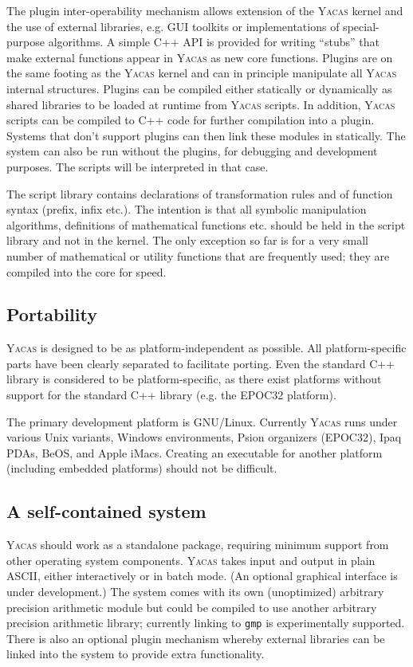 \documentclass{llncs}
\begin{document}
The plugin inter-operability mechanism allows extension of the \textsc{Yacas} kernel and the use of external libraries, e.g. GUI toolkits or implementations of special-purpose algorithms. A simple C++ API is provided for writing ``stubs'' that make external functions appear in \textsc{Yacas} as new core functions. Plugins are on the same footing as the \textsc{Yacas} kernel and can in principle manipulate all \textsc{Yacas} internal structures. Plugins can be compiled either statically or dynamically as shared libraries to be loaded at runtime from \textsc{Yacas} scripts. 
In addition, \textsc{Yacas} scripts can be compiled to C++ code for further
compilation into a plugin. Systems that don't support plugins can then
link these modules in statically. The system can also be run without
the plugins, for debugging and development purposes. The scripts
will be interpreted in that case.

The script library contains declarations of transformation rules and of function
syntax (prefix, infix etc.). The intention is that all symbolic manipulation algorithms, definitions
of mathematical functions etc. should be held in the script library and not in the kernel. The
only exception so far is for a very small number of mathematical or utility
functions that are frequently used; they are compiled into the core for speed.

\subsection*{%
Portability}
\textsc{Yacas} is designed to be as platform-independent as possible.
All platform-specific parts have been clearly separated to facilitate porting.
Even the standard C++ library is considered to be platform-specific, as there
exist  platforms without support for the standard C++ library (e.g. the
EPOC32 platform).

The primary development platform is GNU/Linux. Currently \textsc{Yacas} runs under
various Unix variants, Windows environments, Psion organizers (EPOC32),
Ipaq PDAs,
BeOS, and Apple iMacs. Creating an executable for another platform (including embedded platforms)
should not be difficult.

\subsection*{%
A self-contained system}
\textsc{Yacas} should work as a standalone package, requiring minimum support from other
operating system components. \textsc{Yacas} takes input and output in plain ASCII,
either interactively or in batch mode. (An optional graphical interface is under development.) The system comes with its own
(unoptimized) arbitrary precision arithmetic module but could be compiled to
use another arbitrary precision arithmetic library; currently linking to \small{\texttt{gmp}}
is experimentally supported. There is also an optional plugin mechanism
whereby external libraries can be linked into the system to provide extra
functionality.
\end{document}
